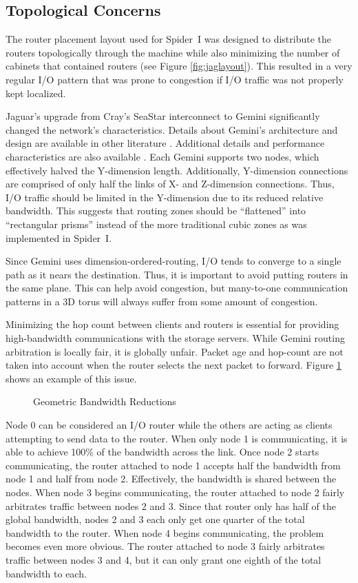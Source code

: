 \subsection{Topological Concerns}
\label{sec:topo}

The router placement layout used for Spider~I was designed to distribute the
routers topologically through the machine while also minimizing the number of
cabinets that contained routers (see Figure \ref{fig:jaglayout}). This resulted
in a very regular I/O pattern that was prone to congestion if I/O traffic was
not properly kept localized.

Jaguar's upgrade from Cray's SeaStar interconnect to Gemini significantly
changed the network's characteristics.  Details about Gemini's architecture and
design are available in other literature \cite{hoti}.  Additional details and
performance characteristics are also available \cite{interconnect}. Each Gemini
supports two nodes, which effectively halved the Y-dimension length.
Additionally, Y-dimension connections are comprised of only half the links of
X- and Z-dimension connections.  Thus, I/O traffic should be limited in the
Y-dimension due to its reduced relative bandwidth.  This suggests that routing
zones should be ``flattened'' into ``rectangular prisms'' instead of the more
traditional cubic zones as was implemented in Spider~I.

Since Gemini uses dimension-ordered-routing, I/O tends to converge to a single
path as it nears the destination.  Thus, it is important to avoid putting
routers in the same plane.  This can help avoid congestion, but many-to-one
communication patterns in a 3D torus will always suffer from some amount of
congestion.

Minimizing the hop count between clients and routers is essential for providing
high-bandwidth communications with the storage servers.  While Gemini routing
arbitration is locally fair, it is globally unfair.  Packet age and hop-count
are not taken into account when the router selects the next packet to forward.
Figure \ref{fig:geombw} shows an example of this issue.

\begin{figure}[h]
  \centering
  
  \caption{Geometric Bandwidth Reductions}\label{fig:geombw}
\end{figure}

Node 0 can be considered an I/O router while the others are acting as clients
attempting to send data to the router.  When only node 1 is communicating, it
is able to achieve 100\% of the bandwidth across the link.  Once node 2 starts
communicating, the router attached to node 1 accepts half the bandwidth from
node 1 and half from node 2.  Effectively, the bandwidth is shared between the
nodes.  When node 3 begins communicating, the router attached to node 2 fairly
arbitrates traffic between nodes 2 and 3.  Since that router only has half of
the global bandwidth, nodes 2 and 3 each only get one quarter of the total
bandwidth to the router.  When node 4 begins communicating, the problem becomes
even more obvious.  The router attached to node 3 fairly arbitrates traffic
between nodes 3 and 4, but it can only grant one eighth of the total bandwidth
to each.

